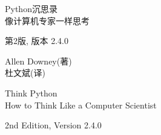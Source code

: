 \documentclass[10pt]{book}
\newcommand{\theversion}{2nd Edition, Version 2.4.0}
\newcommand{\thedate}{}
\begin{document}
\begin{latexonly}

\renewcommand{\blankpage}{\thispagestyle{empty} \quad \newpage}



\thispagestyle{empty}

\begin{flushright}
\vspace*{2.0in}

\begin{spacing}{3}
{\huge Python沉思录}\\
{\Large 像计算机专家一样思考}
\end{spacing}

\vspace{0.25in}

{\small 第2版, 版本 2.4.0}

\thedate
\vspace{1in}

{\Large
	Allen Downey(著)\\
}
{\small 杜文斌(译)}
\vspace{0.5in}

\vfill

\end{flushright}


\blankpage
\blankpage

\pagebreak
\thispagestyle{empty}

\begin{flushright}
\vspace*{2.0in}

\begin{spacing}{3}
{\huge Think Python}\\
{\Large How to Think Like a Computer Scientist}
\end{spacing}

\vspace{0.25in}

\theversion

\thedate


\end{flushright}
\end{latexonly}
\end{document}
